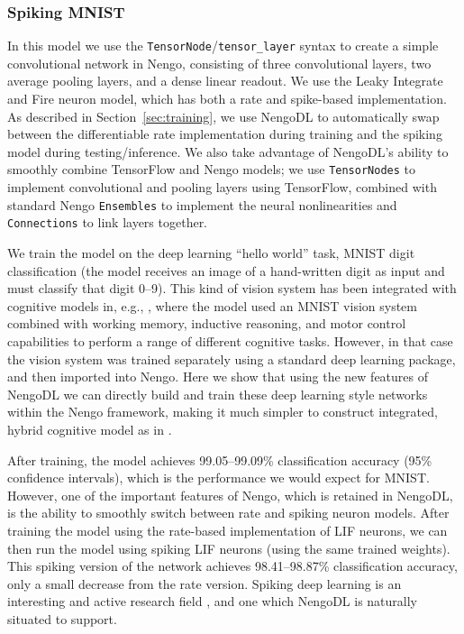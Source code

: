 \documentclass{article}
\begin{document}
\subsubsection{Spiking MNIST}
\label{sec:spiking_mnist}

In this model we use the \texttt{TensorNode}/\texttt{tensor\_layer} syntax to create a simple convolutional network in Nengo, consisting of three convolutional layers, two average pooling layers, and a dense linear readout.  We use the Leaky Integrate and Fire neuron model, which has both a rate and spike-based implementation.  As described in Section~\ref{sec:training}, we use NengoDL to automatically swap between the differentiable rate implementation during training and the spiking model during testing/inference.  We also take advantage of NengoDL's ability to smoothly combine TensorFlow and Nengo models; we use \texttt{TensorNodes} to implement convolutional and pooling layers using TensorFlow, combined with standard Nengo \texttt{Ensembles} to implement the neural nonlinearities and \texttt{Connections} to link layers together.  

We train the model on the deep learning ``hello world'' task, MNIST digit classification (the model receives an image of a hand-written digit as input and must classify that digit 0--9).  This kind of vision system has been integrated with cognitive models in, e.g., \citet{Eliasmith2012a}, where the model used an MNIST vision system combined with working memory, inductive reasoning, and motor control capabilities to perform a range of different cognitive tasks.  However, in that case the vision system was trained separately using a standard deep learning package, and then imported into Nengo.  Here we show that using the new features of NengoDL we can directly build and train these deep learning style networks within the Nengo framework, making it much simpler to construct integrated, hybrid cognitive model as in \citet{Eliasmith2012a}.

After training, the model achieves 99.05--99.09\% classification accuracy (95\% confidence intervals), which is the performance we would expect for MNIST.  However, one of the important features of Nengo, which is retained in NengoDL, is the ability to smoothly switch between rate and spiking neuron models.  After training the model using the rate-based implementation of LIF neurons, we can then run the model using spiking LIF neurons (using the same trained weights).  This spiking version of the network achieves 98.41--98.87\% classification accuracy, only a small decrease from the rate version.  Spiking deep learning is an interesting and active research field \citep{Hunsberger2016,Lee2016}, and one which NengoDL is naturally situated to support.
\end{document}

